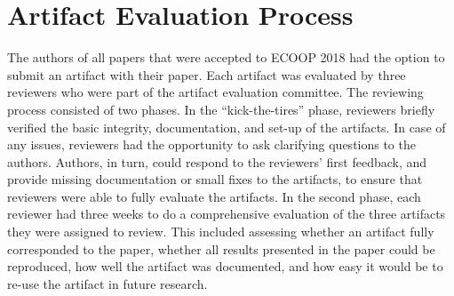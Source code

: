 \documentclass[a4paper,UKenglish]{dartsmaster}
\begin{document}
\chapter{Artifact Evaluation Process}
The authors of all papers that were accepted to ECOOP 2018 had the option to submit an artifact with their paper.
Each artifact was evaluated by three reviewers who were part of the artifact evaluation committee. 
The reviewing process consisted of two phases.
In the ``kick-the-tires'' phase, reviewers briefly verified the basic integrity, documentation, and set-up of the artifacts.
In case of any issues, reviewers had the opportunity to ask clarifying questions to the authors.
Authors, in turn, could respond to the reviewers' first feedback, and provide missing documentation
or small fixes to the artifacts, to ensure that reviewers were able to fully evaluate the artifacts.
In the second phase, each reviewer had three weeks to do a comprehensive evaluation of the three artifacts they were
assigned to review. This included assessing whether an artifact fully corresponded to the paper,
whether all results presented in the paper could be reproduced, how well the artifact was documented,
and how easy it would be to re-use the artifact in future research.
\end{document}
